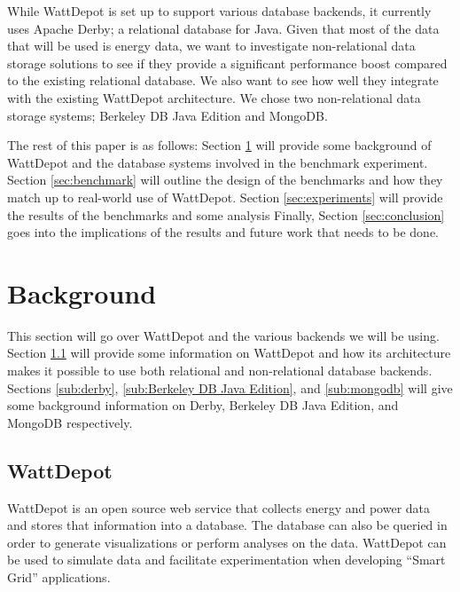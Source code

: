 \documentclass{sig-alternate}
\begin{document}
While WattDepot is set up to support various database backends, it currently uses Apache Derby\cite{apachederby}; a relational database for Java.  Given that most of the data that will be used is energy data, we want to investigate non-relational data storage solutions to see if they provide a significant performance boost compared to the existing relational database.  We also want to see how well they integrate with the existing WattDepot architecture.  We chose two non-relational data storage systems; Berkeley DB Java Edition and MongoDB.

The rest of this paper is as follows: Section \ref{sec:background} will provide some background of WattDepot and the database systems involved in the benchmark experiment.  Section \ref{sec:benchmark} will outline the design of the benchmarks and how they match up to real-world use of WattDepot.  Section \ref{sec:experiments} will provide the results of the benchmarks and some analysis  Finally, Section \ref{sec:conclusion} goes into the implications of the results and future work that needs to be done.

\section{Background}
\label{sec:background}

This section will go over WattDepot and the various backends we will be using.  Section \ref{sub:wattdepot} will provide some information on WattDepot and how its architecture makes it possible to use both relational and non-relational database backends.  Sections \ref{sub:derby}, \ref{sub:Berkeley DB Java Edition}, and \ref{sub:mongodb} will give some background information on Derby, Berkeley DB Java Edition, and MongoDB respectively.

\subsection{WattDepot}
\label{sub:wattdepot}

WattDepot is an open source web service that collects energy and power data and stores that information into a database.  The database can also be queried in order to generate visualizations or perform analyses on the data.  WattDepot can be used to simulate data and facilitate experimentation when developing ``Smart Grid'' applications.
\end{document}
